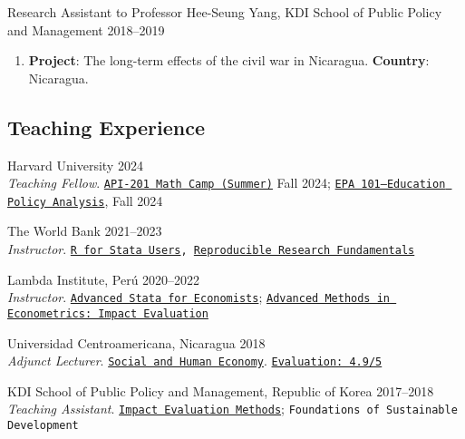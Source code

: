 \documentclass[a4paper,10pt]{article}
\renewenvironment{itemize}{
  \begin{list}{}
    { \setlength{\itemsep}{5pt}
      \setlength{\parsep}{0pt}
      \setlength{\topsep}{0pt}
      \setlength{\leftmargin}{0em} } }{
  \end{list}}
\begin{document}
\begin{itemize}
\begin{enumerate}[leftmargin=10pt, label={}, nosep]
  \end{enumerate}
  \item Research Assistant to Professor Hee-Seung Yang, KDI School of Public Policy and Management \hfill 2018--2019  
  \begin{enumerate}[leftmargin=10pt, label={}, nosep]  
    \item {\small \textbf{Project}: The long-term effects of the civil war in Nicaragua. \newline \textbf{Country}: Nicaragua.}
  \end{enumerate}
\end{itemize}

\subsection*{Teaching Experience}
\begin{itemize}
  \item Harvard University
  \hfill 2024 \\
{\small \emph{Teaching Fellow}.
\texttt{\href{https://github.com/harvard-api209/summer-assignments}{API-201 Math
Camp (Summer)}} Fall 2024; \texttt{\href{https://rrmaximiliano.github.io/epa_workshops/}{EPA 101--Education Policy Analysis}}, Fall 2024}
  \item The World Bank \hfill 2021--2023 \\  {\small \emph{Instructor}.} \texttt{\href{https://github.com/worldbank/dime-r-training}{R for Stata Users}, \href{https://github.com/dime-worldbank/rrf-course}{\texttt{Reproducible Research Fundamentals}}}

  \item Lambda Institute, Perú \hfill 2020--2022 \\ {\small \emph{Instructor}.} \texttt{\href{https://github.com/lambda-stata/course-materials}{Advanced Stata for Economists}}; \href{https://github.com/lambda-stata/econometria-avanzada}{\texttt{Advanced Methods in Econometrics: Impact Evaluation}}
 
  \item Universidad Centroamericana, Nicaragua \hfill 2018 \\ {\small \emph{Adjunct Lecturer}.} \texttt{\href{https://github.com/econsoc-uca}{Social and Human Economy}}. \texttt{\href{https://rrmaximiliano.github.io/docs/evaluation-esh.pdf}{Evaluation: 4.9/5}}
  
  \item KDI School of Public Policy and Management, Republic of Korea \hfill
  2017--2018 \\ {\small \emph{Teaching Assistant}.}
  \texttt{\href{https://www.dropbox.com/home/teaching_materials/kdischool/spring_2018_impact_evaluation}{Impact
  Evaluation Methods}}; \texttt{\textcolor{webbrown}{Foundations of Sustainable
  Development}}
\end{itemize}
\end{document}
